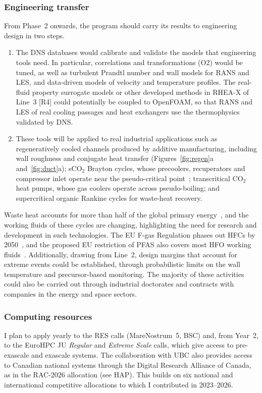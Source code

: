\documentclass[11pt]{article}
\begin{document}
\subsubsection{Engineering transfer} 
From Phase~2 onwards, the program should carry its results to engineering design in two steps.
\begin{enumerate}
	\item The DNS databases would calibrate and validate the models that engineering tools need. In particular, correlations and transformations (O2) would be tuned, as well as turbulent Prandtl number and wall models for RANS and LES, and data-driven models of velocity and temperature profiles. The real-fluid property surrogate models or other developed methods in RHEA-X of Line~3 [R4] could potentially be coupled to OpenFOAM, so that RANS and LES of real cooling passages and heat exchangers use the thermophysics validated by DNS.
	
	\item These tools will be applied to real industrial applications such as regeneratively cooled channels produced by additive manufacturing, including wall roughness and conjugate heat transfer (Figures~\ref{fig:regen}a and~\ref{fig:duct}a); 
	sCO$_2$ Brayton cycles, whose precoolers, recuperators and compressor inlet operate near the pseudo-critical point~\cite{Ahn2015}; 
	transcritical CO$_2$ heat pumps, whose gas coolers operate across pseudo-boiling; and supercritical organic Rankine cycles for waste-heat recovery. 
\end{enumerate}
Waste heat accounts for more than half of the global primary energy~\cite{Markides2025}, and the working fluids of these cycles are changing, highlighting the need for research and development in such technologies. The EU F-gas Regulation phases out HFCs by 2050~\cite{FGas2024}, and the proposed EU restriction of PFAS also covers most HFO working fluids~\cite{ECHA2025}. 
Additionally, drawing from Line~2, design margins that account for extreme events could be established, through probabilistic limits on the wall temperature and precursor-based monitoring.
The majority of these activities could also be carried out through industrial doctorates and contracts with companies in the energy and space sectors.


\subsubsection{Computing resources} 
I plan to apply yearly to the RES calls (MareNostrum~5, BSC) and, from Year~2, to the EuroHPC JU \emph{Regular} and \emph{Extreme Scale} calls, which give access to pre-exascale and exascale systems. 
The collaboration with UBC also provides access to Canadian
national systems through the Digital Research Alliance of Canada, as in the RAC-2026 allocation (see HAP). 
This builds on six national and international competitive allocations to which I contributed in 2023--2026.
\end{document}
